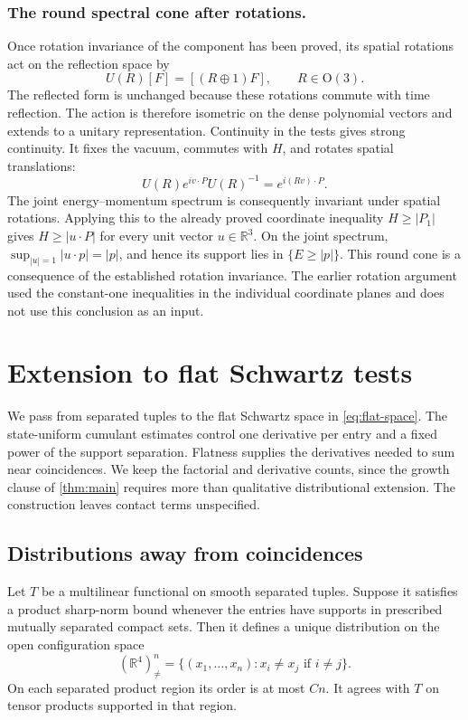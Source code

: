 \documentclass[11pt,letterpaper,reqno]{amsart}
\makeatletter
\theoremstyle{definition}
\newcommand{\ms@minorstart}{%
  \pushQED{\qed}\renewcommand{\qedsymbol}{$\blacksquare$}}
\newenvironment{proposition}[1][]{\ms@minorstart\ms@proposition[#1]}
  {\popQED\endms@proposition}
\theoremstyle{remark}
\newcommand{\R}{\mathbb R}
\makeatother
\begin{document}
\subsubsection*{The round spectral cone after rotations.}
Once rotation invariance of the component has been proved, its
spatial rotations act on the reflection space by
\[
 U(R)[F]=[(R\oplus1)F],\qquad R\in\mathrm O(3).
\]
The reflected form is unchanged because these rotations commute
with time reflection. The action is therefore isometric on the
dense polynomial vectors and extends to a unitary representation.
Continuity in the tests gives strong continuity. It fixes the vacuum,
commutes with $H$, and rotates spatial translations:
\[
 U(R)e^{iv\cdot P}U(R)^{-1}=e^{i(Rv)\cdot P}.
\]
The joint energy--momentum spectrum is consequently invariant under
spatial rotations. Applying this to the already proved coordinate
inequality $H\ge|P_1|$ gives $H\ge|u\cdot P|$ for every unit vector
$u\in\R^3$. On the joint spectrum,
$\sup_{|u|=1}|u\cdot p|=|p|$, and hence its support lies in
$\{E\ge|p|\}$. This round cone is a consequence of the established
rotation invariance. The earlier rotation argument used the
constant-one inequalities in the individual coordinate planes and
does not use this conclusion as an input.


\section{Extension to flat Schwartz tests}\label{sec:extension}

We pass from separated tuples to the flat Schwartz space in
\eqref{eq:flat-space}. The state-uniform cumulant estimates control
one derivative per entry and a fixed power of the support separation.
Flatness supplies the derivatives needed to sum near coincidences.
We keep the factorial and derivative counts, since the growth clause
of \cref{thm:main} requires more than qualitative distributional
extension. The construction leaves contact terms unspecified.

\subsection{Distributions away from coincidences}

\begin{proposition}[The local distribution]\label{prop:configuration-distribution}
Let $T$ be a multilinear functional on smooth separated tuples. Suppose
it satisfies a product sharp-norm bound whenever the entries have
supports in prescribed mutually separated compact sets. Then it defines
a unique distribution on the open configuration space
\[
 (\R^4)^n_{\ne}=\{(x_1,\ldots,x_n):x_i\ne x_j\text{ if }i\ne j\}.
\]
On each separated product region its order is at most $Cn$. It agrees
with $T$ on tensor products supported in that region.
\end{proposition}
\end{document}
